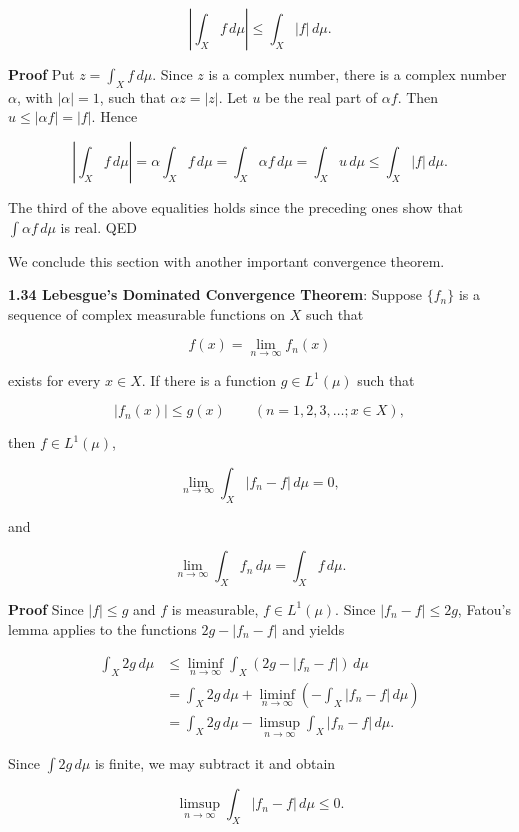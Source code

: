 \documentclass[11pt]{article}
\begin{document}
\[
\left| \int_{X} f \, d\mu \right| \leq \int_{X} |f| \, d\mu.
\]

\textbf{\textbf{Proof}} Put \(z = \int_{X} f \, d\mu\). Since \(z\) is a complex number, there is a complex number \(\alpha\), with \(|\alpha| = 1\), such that \(\alpha z = |z|\). Let \(u\) be the real part of \(\alpha f\). Then \(u \leq |\alpha f| = |f|\). Hence

\[
\left| \int_{X} f \, d\mu \right| = \alpha \int_{X} f \, d\mu = \int_{X} \alpha f \, d\mu = \int_{X} u \, d\mu \leq \int_{X} |f| \, d\mu.
\]

The third of the above equalities holds since the preceding ones show that \(\int \alpha f \, d\mu\) is real. QED

We conclude this section with another important convergence theorem.

\label{org18a8b9b}
\textbf{\textbf{1.34 Lebesgue's Dominated Convergence Theorem}}: Suppose \(\{f_{n}\}\) is a sequence of complex measurable functions on \(X\) such that

\[
f(x) = \lim_{n \to \infty} f_{n}(x)\tag{1}
\]

exists for every \(x \in X\). If there is a function \(g \in L^{1}(\mu)\) such that

\[|f_{n}(x)| \leq g(x) \qquad (n = 1, 2, 3, \ldots; x \in X),\tag{2}\]

then \(f \in L^{1}(\mu)\),

\[
\lim_{n \to \infty} \int_{X} |f_{n} - f| \, d\mu = 0,\tag{3}
\]

and

\[
\lim_{n \to \infty} \int_{X} f_{n} \, d\mu = \int_{X} f \, d\mu.\tag{4}
\]

\textbf{\textbf{Proof}} Since \(|f| \leq g\) and \(f\) is measurable, \(f \in L^{1}(\mu)\). Since \(|f_{n} - f| \leq 2g\), Fatou's lemma applies to the functions \(2g - |f_{n} - f|\) and yields

\[\begin{aligned}
  \int_{X} 2g \, d\mu & \leq \liminf_{n \to \infty} \int_{X} (2g - |f_{n} - f|) \, d\mu\\
& = \int_{X} 2g \, d\mu + \liminf_{n \to \infty} \left( -\int_{X} |f_{n} - f| \, d\mu \right)\\
& = \int_{X} 2g \, d\mu - \limsup_{n \to \infty} \int_{X} |f_{n} - f| \, d\mu.
\end{aligned}\]

Since \(\int 2g \, d\mu\) is finite, we may subtract it and obtain

\[
\limsup_{n \to \infty} \int_{X} |f_{n} - f| \, d\mu \leq 0.\tag{5}
\]
\end{document}
